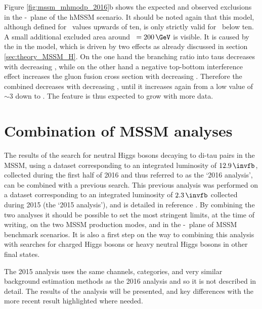 Figure \ref{fig:mssm_mhmodp_2016}b shows the expected
and observed exclusions
in the \mA-\tanb~plane of the hMSSM scenario. 
It should be noted again that this model, although defined for \tanb~values
upwards of ten, is only strictly valid for \tanb~below ten.
A small additional excluded area around \mA~$=200\,\GeV$ is visible.
It is caused by the 
\xsbr in the model, which is driven by
two effects as already discussed in section \ref{sec:theory_MSSM_H}. On the one hand the branching ratio into taus decreases with decreasing
\tanb, while on the other hand a negative top-bottom interference effect increases the
gluon fusion cross section with decreasing \tanb. Therefore the
combined \xsbr decreases with decreasing \tanb, until it
increases again from a low value of \tanb~$\sim 3$ down to . The feature is 
thus expected to grow with more data.

\chapter{Combination of MSSM analyses}
\label{sec:mssm_combination}
The results of the search for neutral Higgs bosons decaying to di-tau pairs in the \ac{MSSM}, 
using a dataset
corresponding to an integrated luminosity of $12.9\,\invfb$, collected during the
first half of 2016 and thus referred to as the `2016 analysis', can be combined 
with a previous search. This previous analysis
was performed on a dataset corresponding to an integrated luminosity of $2.3\,\invfb$ 
collected during 2015 (the `2015 analysis'), and is detailed in reference \cite{CMS-PAS-HIG-16-006}.
By combining the two analyses it should be possible to set the most stringent
limits, at the time of writing, on the two \ac{MSSM} production modes, and in the \mA-\tanb~plane of 
\ac{MSSM} benchmark scenarios. It is also
a first step on the way to combining this \AHtotautau analysis with
searches for charged Higgs bosons or heavy neutral Higgs bosons in 
other final states. 

The 2015 analysis uses the same channels, categories, and very
similar background estimation methods as the 2016 analysis and so
it is not described in detail. The results of the analysis will 
be presented, and key differences with the more recent result highlighted
where needed.

